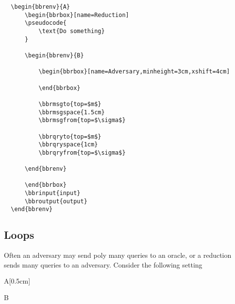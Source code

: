 \documentclass[a4paper]{report}
\begin{document}
  \begin{lstlisting}
  \begin{bbrenv}{A}
	  \begin{bbrbox}[name=Reduction]
	  \pseudocode{
		  \text{Do something} 
	  }
  
	  \begin{bbrenv}{B}
  
		  \begin{bbrbox}[name=Adversary,minheight=3cm,xshift=4cm]
  
		  \end{bbrbox}
		  
		  \bbrmsgto{top=$m$}
		  \bbrmsgspace{1.5cm}
		  \bbrmsgfrom{top=$\sigma$}
  
		  \bbrqryto{top=$m$}
		  \bbrqryspace{1cm}
		  \bbrqryfrom{top=$\sigma$}
  
	  \end{bbrenv}
  
	  \end{bbrbox}
	  \bbrinput{input}
	  \bbroutput{output}
  \end{bbrenv}
  \end{lstlisting}
  
  
  \subsection{Loops}
  Often an adversary may send poly many queries to an oracle, or a reduction sends many queries to an adversary.
  Consider the following setting
  
  \begin{bbrenv}[1cm]{A}[0.5cm]
	  \begin{bbrbox}[name=Reduction]
  
	  \begin{bbrenv}{B}
  
		  \begin{bbrbox}[name=Adversary,minheight=3cm,xshift=4cm]
  
		  \end{bbrbox}
		  
  
	  \end{bbrenv}
  
	  \end{bbrbox}
  \end{bbrenv}
  
\end{document}
